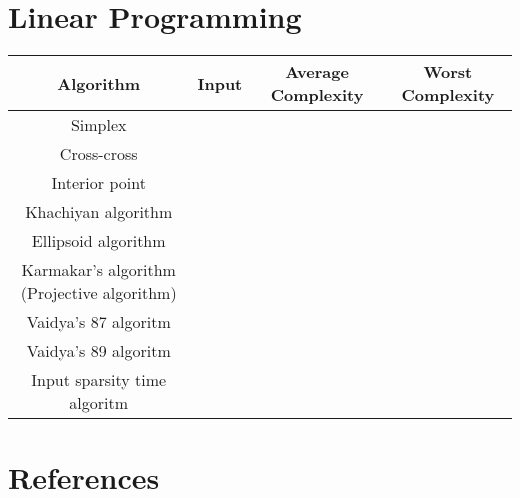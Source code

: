 \documentclass{article}
\begin{document}

\newpage
\section*{Linear Programming}

\begin{table}[ht]
	\centering
	\scriptsize
	\begin{tabular}{c ccc}
		\textbf{Algorithm} &  \textbf{Input} &  \textbf{Average Complexity} & \textbf{Worst Complexity} \\
		\hline
		Simplex &&& \\
		Cross-cross &&& \\
		Interior point &&& \\
		Khachiyan algorithm &&& \\
		Ellipsoid algorithm &&& \\
		Karmakar's algorithm (Projective algorithm) &&& \\
		Vaidya's 87 algoritm &&& \\
		Vaidya's 89 algoritm &&& \\
		Input sparsity time algoritm &&& \\
		\hline
	\end{tabular}
\end{table}


\newpage
\section*{References}
\end{document}
